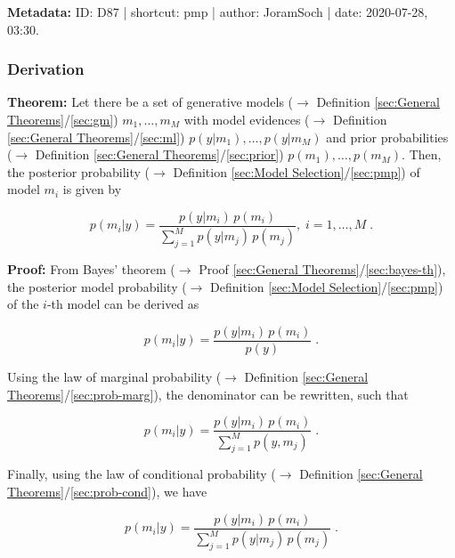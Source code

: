 \documentclass[a4paper,12pt,twoside]{book}
\begin{document}
\vspace{1em}
\textbf{Metadata:} ID: D87 | shortcut: pmp | author: JoramSoch | date: 2020-07-28, 03:30.
\vspace{1em}



\subsubsection[\textbf{Derivation}]{Derivation} \label{sec:pmp-der}
\setcounter{equation}{0}

\textbf{Theorem:} Let there be a set of generative models ($\rightarrow$ Definition \ref{sec:General Theorems}/\ref{sec:gm}) $m_1, \ldots, m_M$ with model evidences ($\rightarrow$ Definition \ref{sec:General Theorems}/\ref{sec:ml}) $p(y \vert m_1), \ldots, p(y \vert m_M)$ and prior probabilities ($\rightarrow$ Definition \ref{sec:General Theorems}/\ref{sec:prior})  $p(m_1), \ldots, p(m_M)$. Then, the posterior probability ($\rightarrow$ Definition \ref{sec:Model Selection}/\ref{sec:pmp}) of model $m_i$ is given by

\begin{equation} \label{eq:pmp-der-PMP}
p(m_i|y) = \frac{p(y|m_i) \, p(m_i)}{\sum_{j=1}^{M} p(y|m_j) \, p(m_j)}, \; i = 1, \ldots, M \; .
\end{equation}


\vspace{1em}
\textbf{Proof:} From Bayes' theorem ($\rightarrow$ Proof \ref{sec:General Theorems}/\ref{sec:bayes-th}), the posterior model probability ($\rightarrow$ Definition \ref{sec:Model Selection}/\ref{sec:pmp}) of the $i$-th model can be derived as

\begin{equation} \label{eq:pmp-der-PMP-s1}
p(m_i|y) = \frac{p(y|m_i) \, p(m_i)}{p(y)} \; .
\end{equation}

Using the law of marginal probability ($\rightarrow$ Definition \ref{sec:General Theorems}/\ref{sec:prob-marg}), the denominator can be rewritten, such that

\begin{equation} \label{eq:pmp-der-PMP-s2}
p(m_i|y) = \frac{p(y|m_i) \, p(m_i)}{\sum_{j=1}^{M} p(y,m_j)} \; .
\end{equation}

Finally, using the law of conditional probability ($\rightarrow$ Definition \ref{sec:General Theorems}/\ref{sec:prob-cond}), we have

\begin{equation} \label{eq:pmp-der-PMP-s3}
p(m_i|y) = \frac{p(y|m_i) \, p(m_i)}{\sum_{j=1}^{M} p(y|m_j) \, p(m_j)} \; .
\end{equation}
\end{document}
